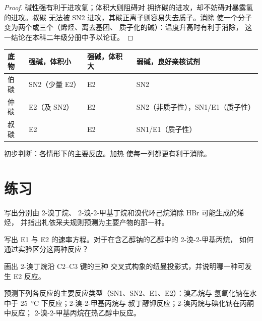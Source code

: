\begin{proof}
碱性强有利于进攻氢；体积大则阻碍对
拥挤碳的进攻，却不妨碍对暴露氢的进攻。叔碳
无法被 SN2 进攻，其碳正离子则容易失去质子。消除
使一个分子变为两个或三个（烯烃、离去基团、
质子化的碱）：温度升高时有利于消除，
这一结论在本科二年级分册中予以论证。
\end{proof}

\begin{omfigure}
\begin{tabular}{llll}
\hline
底物 & 强碱，体积小 & 强碱，体积大 & 弱碱，良好亲核试剂 \\
\hline
伯碳 & SN2（少量 E2） & E2 & SN2 \\
仲碳 & E2（及 SN2） & E2 & SN2（非质子性），SN1/E1（质子性） \\
叔碳 & E2 & E2 & SN1/E1（质子性） \\
\hline
\end{tabular}

\smallskip
{\small 初步判断：各情形下的主要反应。加热
使每一列都更有利于消除。}
\end{omfigure}

\section{练习}

\begin{exercise}[$\star$]\label{exo:b1:elimination:1}
写出分别由 2-溴丁烷、
2-溴-2-甲基丁烷和溴代环己烷消除 HBr 可能生成的烯烃，
并指出札依采夫规则预测为主要产物的那一种。
\end{exercise}

\begin{exercise}[$\star$]\label{exo:b1:elimination:2}
写出 E1 与 E2 的速率方程。对于在含乙醇钠的乙醇中的 2-溴-2-甲基丙烷，
如何通过实验区分这两种反应？
\end{exercise}

\begin{exercise}[$\star$]\label{exo:b1:elimination:3}
画出 2-溴丁烷沿 C2--C3 键的三种
交叉式构象的纽曼投影式，并说明哪一种可发生 E2 反应。
\end{exercise}

\begin{exercise}[$\star$]\label{exo:b1:elimination:4}
预测下列各反应的主要反应类型（SN1、SN2、E1、E2）：溴乙烷与
氢氧化钠在水中于 \qty{25}{\celsius} 下反应；2-溴-2-甲基丙烷与
叔丁醇钾反应；2-溴丙烷与碘化钠在丙酮中反应；
2-溴-2-甲基丙烷在热乙醇中反应。
\end{exercise}

